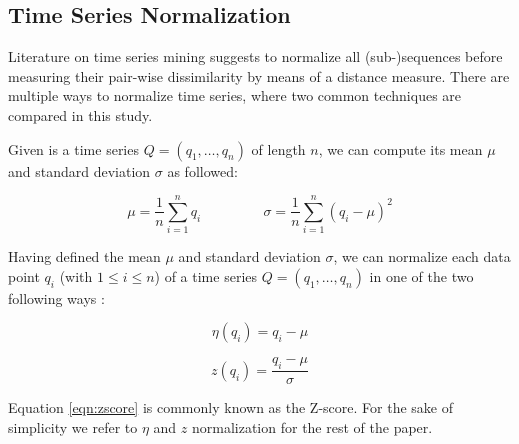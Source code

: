 \subsection{Time Series Normalization} \label{time_series_normalization}

Literature on time series mining \cite{ding2008querying,spiegel2015diss} suggests to normalize all (sub-)sequences before measuring their pair-wise dissimilarity by means of a distance measure. There are multiple ways to normalize time series, where two common techniques \cite{das1998rule} are compared  in this study.

Given is a time series $Q = (q_1, \dots, q_n)$ of length $n$, we can compute its mean $\mu$ and standard deviation $\sigma$ as followed:

\begin{equation*}
\mu = \frac{1}{n} \sum_{i=1}^{n} q_i 	\;\;\;\;\;\;\;\;\;\;\;\;\;\;\;\; 	\sigma = \frac{1}{n} \sum_{i=1}^{n} (q_i - \mu)^2
\end{equation*}

Having defined the mean $\mu$ and standard deviation $\sigma$, we can normalize each data point $q_i$ (with $1\leq i \leq n$) of a time series $Q = (q_1, \dots, q_n)$ in one of the two following ways \cite{das1998rule}:

\begin{equation}
\eta(q_i) = q_i - \mu
\end{equation}

\begin{equation}
z(q_i) = \frac{q_i - \mu}{\sigma}
\label{eqn:zscore}
\end{equation}

Equation \ref{eqn:zscore} is commonly known as the Z-score. For the sake of simplicity we refer to $\eta$ and $z$ normalization \cite{das1998rule} for the rest of the paper.



